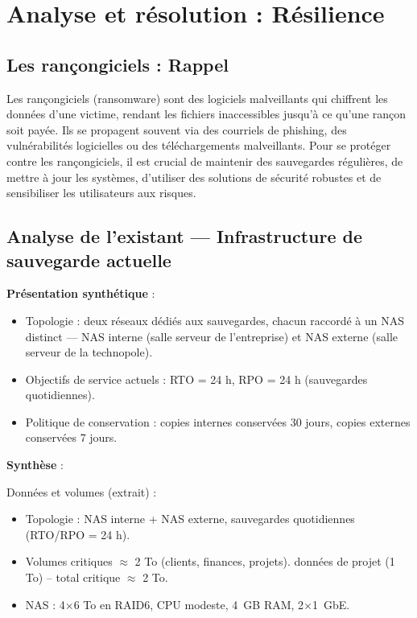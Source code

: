 \newpage

\section*{Analyse et résolution : Résilience}
	
\subsection*{Les rançongiciels : Rappel}
{}
\noindent Les rançongiciels (ransomware) sont des logiciels malveillants qui chiffrent les données d'une victime, rendant les fichiers inaccessibles jusqu'à ce qu'une rançon soit payée. Ils se propagent souvent via des courriels de phishing, des vulnérabilités logicielles ou des téléchargements malveillants. Pour se protéger contre les rançongiciels, il est crucial de maintenir des sauvegardes régulières, de mettre à jour les systèmes, d'utiliser des solutions de sécurité robustes et de sensibiliser les utilisateurs aux risques.

\subsection*{Analyse de l'existant — Infrastructure de sauvegarde actuelle}
{}

\noindent \textbf{Présentation synthétique} :
\begin{itemize}
	\item Topologie : deux réseaux dédiés aux sauvegardes, chacun raccordé à un NAS distinct — NAS interne (salle serveur de l’entreprise) et NAS externe (salle serveur de la technopole).
	\item Objectifs de service actuels : RTO = 24 h, RPO = 24 h (sauvegardes quotidiennes).
	\item Politique de conservation : copies internes conservées 30 jours, copies externes conservées 7 jours.
\end{itemize}

\noindent \textbf{Synthèse} :

\noindent Données et volumes (extrait) :
\begin{itemize}
	\item Topologie : NAS interne + NAS externe, sauvegardes quotidiennes (RTO/RPO = 24 h).
	\item Volumes critiques $\approx$ 2 To (clients, finances, projets). données de projet (1 To) -- total critique $\approx$ 2 To.
	\item NAS : 4×6 To en RAID6, CPU modeste, 4~GB RAM, 2×1~GbE.
\end{itemize}

